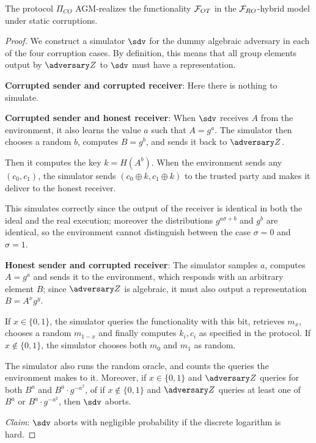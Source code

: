 \begin{theorem}
    The protocol $\Pi_{CO}$ AGM-realizes the functionality $\mathcal{F}_{OT}$ in the $\mathcal{F}_{RO}$-hybrid model under static corruptions.
\end{theorem}
\begin{proof}
    We construct a simulator $\sdv$ for the dummy algebraic adversary in each of the four corruption cases. By definition, this means that all group elements output by $\zdv$ to $\sdv$ must have a representation.

    \textbf{Corrupted sender and corrupted receiver}: Here there is nothing to simulate.

    \textbf{Corrupted sender and honest receiver}: When $\sdv$ receives $A$ from the environment, it also learns the value $a$ such that $A=g^a$.
    The simulator then chooses a random $b$, computes $B=g^b$, and sends it back to $\zdv$.

    Then it computes the key $k=H(A^b)$. When the environment sends any $(c_0,c_1)$, the simulator sends $(c_0\oplus k, c_1\oplus k)$ to the trusted party and makes it deliver to the honest receiver.

    This simulates correctly since the output of the receiver is identical in both the ideal and the real execution; moreover the distributions $g^{a\sigma+b}$ and $g^b$ are identical, so the environment cannot distinguish between the case $\sigma=0$ and $\sigma=1$.

    \textbf{Honest sender and corrupted receiver}: The simulator samples $a$, computes $A=g^a$ and sends it to the environment, which responds with an arbitrary element $B$; since $\zdv$ is algebraic, it must also output a representation $B=A^x g^y$.

    If $x\in\{0,1\}$, the simulator queries the functionality with this bit, retrieves $m_x$, chooses a random $m_{1-x}$ and finally computes $k_i,c_i$ as specified in the protocol. If $x\not\in\{0,1\}$, the simulator chooses both $m_0$ and $m_1$ as random.

    The simulator also runs the random oracle, and counts the queries the environment makes to it. Moreover, if $x\in\{0,1\}$ and $\zdv$ queries for both $B^a$ and $B^a\cdot g^{-a^2}$, of if $x\not\in\{0,1\}$ and $\zdv$ queries at least one of $B^a$ or $B^a\cdot g^{-a^2}$, then $\sdv$ aborts.

    \textit{Claim}: $\sdv$ aborts with negligible probability if the discrete logarithm is hard.


\end{proof}
